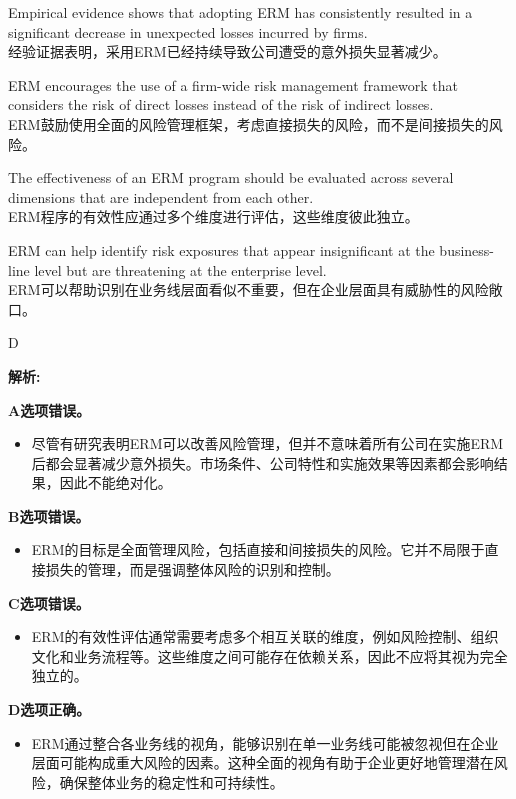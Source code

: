 \documentclass{article}
\newenvironment{explanation}
{\textbf{解析:}\par}
{\par}
\begin{document}
    \begin{choices}
        \item Empirical evidence shows that adopting ERM has consistently resulted in a significant decrease in unexpected losses incurred by firms.  \\
        经验证据表明，采用ERM已经持续导致公司遭受的意外损失显著减少。
        \item ERM encourages the use of a firm-wide risk management framework that considers the risk of direct losses instead of the risk of indirect losses.  \\
        ERM鼓励使用全面的风险管理框架，考虑直接损失的风险，而不是间接损失的风险。
        \item The effectiveness of an ERM program should be evaluated across several dimensions that are independent from each other.  \\
        ERM程序的有效性应通过多个维度进行评估，这些维度彼此独立。
        \item ERM can help identify risk exposures that appear insignificant at the business-line level but are threatening at the enterprise level.  \\
        ERM可以帮助识别在业务线层面看似不重要，但在企业层面具有威胁性的风险敞口。
    \end{choices}
    
    \begin{correctanswer}
    D
    \end{correctanswer}
    
    \begin{explanation}
        \textbf{A选项错误。}
        \begin{itemize}
            \item 尽管有研究表明ERM可以改善风险管理，但并不意味着所有公司在实施ERM后都会显著减少意外损失。市场条件、公司特性和实施效果等因素都会影响结果，因此不能绝对化。
        \end{itemize}
    
        \textbf{B选项错误。}
        \begin{itemize}
            \item ERM的目标是全面管理风险，包括直接和间接损失的风险。它并不局限于直接损失的管理，而是强调整体风险的识别和控制。
        \end{itemize}
    
        \textbf{C选项错误。}
        \begin{itemize}
            \item ERM的有效性评估通常需要考虑多个相互关联的维度，例如风险控制、组织文化和业务流程等。这些维度之间可能存在依赖关系，因此不应将其视为完全独立的。
        \end{itemize}
    
        \textbf{D选项正确。}
        \begin{itemize}
            \item ERM通过整合各业务线的视角，能够识别在单一业务线可能被忽视但在企业层面可能构成重大风险的因素。这种全面的视角有助于企业更好地管理潜在风险，确保整体业务的稳定性和可持续性。
        \end{itemize}
    \end{explanation}
    
\end{document}

